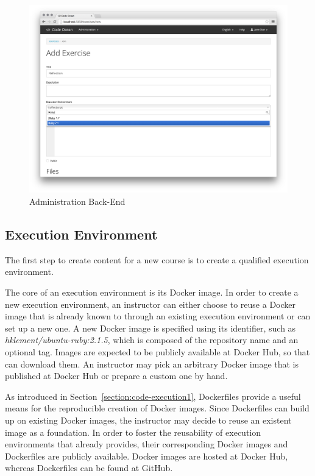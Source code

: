 \begin{figure}
\centering
\includegraphics[width=\textwidth]{images/administration.png}
\vspace{-1cm}
\caption{Administration Back-End}
\label{figure:administration}
\end{figure}

\subsection{Execution Environment}

The first step to create content for a new course is to create a qualified execution environment.

The core of an execution environment is its Docker image. In order to create a new execution environment, an instructor can either choose to reuse a Docker image that is already known to \tool through an existing execution environment or can set up a new one. A new Docker image is specified using its identifier, such as \emph{hklement/ubuntu-ruby:2.1.5}, which is composed of the repository name and an optional tag. Images are expected to be publicly available at Docker Hub, so that \tool can download them. An instructor may pick an arbitrary Docker image that is published at Docker Hub or prepare a custom one by hand.

As introduced in Section~\ref{section:code-execution1}, Dockerfiles provide a useful means for the reproducible creation of Docker images. Since Dockerfiles can build up on existing Docker images, the instructor may decide to reuse an existent image as a foundation. In order to foster the reusability of execution environments that \tool already provides, their corresponding Docker images and Dockerfiles are publicly available. Docker images are hosted at Docker Hub, whereas Dockerfiles can be found at GitHub.


